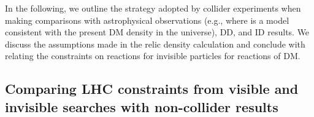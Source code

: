 
In the following, we outline the strategy adopted by collider experiments when making comparisons with astrophysical observations (e.g., where is a model consistent with the present DM density in the universe), DD, and ID results. We discuss the assumptions made in the relic density calculation and conclude with relating the constraints on reactions for invisible particles for reactions of DM.


\subsection{Comparing LHC constraints from visible and invisible searches with non-collider results}



